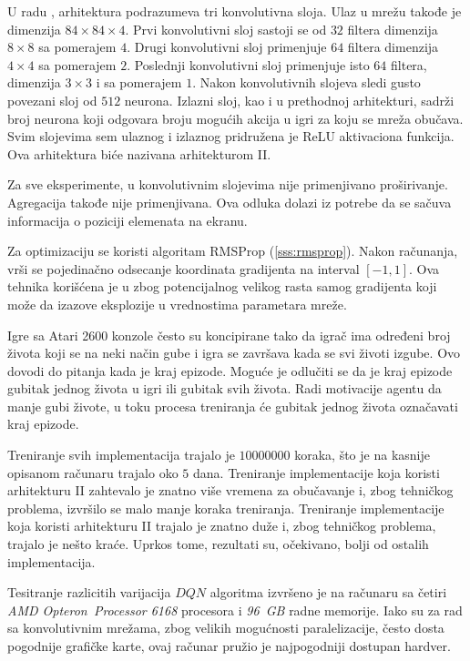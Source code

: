 U radu \cite{dqn_dm}, arhitektura podrazumeva tri konvolutivna sloja. Ulaz u mrežu takođe je dimenzija $84 \times 84 \times 4$. Prvi konvolutivni sloj sastoji se od $32$ filtera dimenzija $8 \times 8$ sa pomerajem $4$. Drugi konvolutivni sloj primenjuje $64$ filtera dimenzija $4 \times 4$ sa pomerajem $2$. Poslednji konvolutivni sloj primenjuje isto $64$ filtera, dimenzija $3 \times 3$ i sa pomerajem $1$. Nakon konvolutivnih slojeva sledi gusto povezani sloj od $512$ neurona. Izlazni sloj, kao i u prethodnoj arhitekturi, sadrži broj neurona koji odgovara broju mogućih akcija u igri za koju se mreža obučava. Svim slojevima sem ulaznog i izlaznog pridružena je ReLU aktivaciona funkcija. Ova arhitektura biće nazivana arhitekturom II.
\par 
Za sve eksperimente, u konvolutivnim slojevima nije primenjivano proširivanje. Agregacija takođe nije primenjivana. Ova odluka dolazi iz potrebe da se sačuva informacija o poziciji elemenata na ekranu.
\par 
Za optimizaciju se koristi algoritam RMSProp (\ref{sss:rmsprop}). Nakon računanja, vrši se pojedinačno odsecanje koordinata gradijenta na interval $[-1, 1]$. Ova tehnika korišćena je u \cite{dqn_dm} zbog potencijalnog velikog rasta samog gradijenta koji može da izazove eksplozije u vrednostima parametara mreže.
\par 
Igre sa Atari 2600 konzole često su koncipirane tako da igrač ima određeni broj života koji se na neki način gube i igra se završava kada se svi životi izgube. Ovo dovodi do pitanja kada je kraj epizode. Moguće je odlučiti se da je kraj epizode gubitak jednog života u igri ili gubitak svih života. Radi motivacije agentu da manje gubi živote, u toku procesa treniranja će gubitak jednog života označavati kraj epizode.
\par 
Treniranje svih implementacija trajalo je $10000000$ koraka, što je na kasnije opisanom računaru trajalo oko $5$ dana. Treniranje implementacije koja koristi arhitekturu II zahtevalo je znatno više vremena za obučavanje i, zbog tehničkog problema, izvršilo se malo manje koraka treniranja.
Treniranje implementacije koja koristi arhitekturu II trajalo je znatno duže i, zbog tehničkog problema, trajalo je nešto kraće. Uprkos tome, rezultati su, očekivano, bolji od ostalih implementacija.
\par 
Tesitranje razlicitih varijacija $DQN$ algoritma izvršeno je na računaru sa četiri {\em AMD Opteron\texttrademark ~Processor 6168} procesora i {\em 96~GB} radne memorije. Iako su za rad sa konvolutivnim mrežama, zbog velikih mogućnosti paralelizacije, često dosta pogodnije grafičke karte, ovaj računar pružio je najpogodniji dostupan hardver. 

